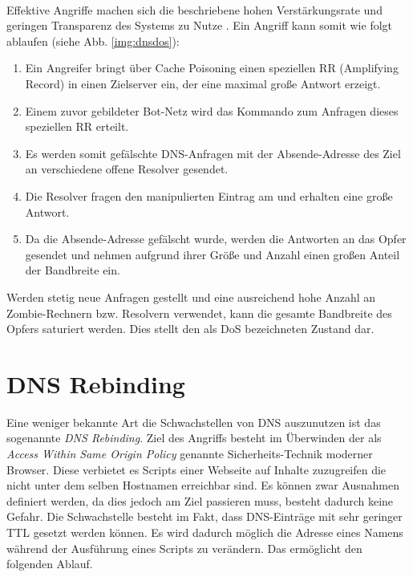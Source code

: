 \paragraph{}
Effektive Angriffe machen sich die beschriebene hohen Verstärkungsrate und geringen Transparenz des Systems zu Nutze \cite{Kambourakis2008}. Ein Angriff kann somit wie folgt ablaufen (siehe Abb. \ref{img:dnsdos}):
\begin{enumerate}[topsep=0pt,itemsep=-1ex,partopsep=1ex,parsep=1ex]
    \item Ein Angreifer bringt über Cache Poisoning einen speziellen RR (Amplifying Record) in einen Zielserver ein, der eine maximal große Antwort erzeigt.
    \item Einem zuvor gebildeter Bot-Netz wird das Kommando zum Anfragen dieses speziellen RR erteilt. 
    \item Es werden somit gefälschte DNS-Anfragen mit der Absende-Adresse des Ziel an verschiedene offene Resolver gesendet.
    \item Die Resolver fragen den manipulierten Eintrag am und erhalten eine große Antwort.
    \item Da die Absende-Adresse gefälscht wurde, werden die Antworten an das Opfer gesendet und nehmen aufgrund ihrer Größe und Anzahl einen großen Anteil der Bandbreite ein. 
\end{enumerate}
Werden stetig neue Anfragen gestellt und eine ausreichend hohe Anzahl an Zombie-Rechnern bzw. Resolvern verwendet, kann die gesamte Bandbreite des Opfers saturiert werden. Dies stellt den als \ac{DoS} bezeichneten Zustand dar.

\section{DNS Rebinding}
\label{sec:attack-dnsrebind}
Eine weniger bekannte Art die Schwachstellen von DNS auszunutzen ist das sogenannte \textit{DNS Rebinding}. Ziel des Angriffs besteht im Überwinden der als \textit{Access Within Same Origin Policy} genannte Sicherheits-Technik moderner Browser. Diese verbietet es Scripts einer Webseite auf Inhalte zuzugreifen die nicht unter dem selben Hostnamen erreichbar sind. Es können zwar Ausnahmen definiert werden, da dies jedoch am Ziel passieren muss, besteht dadurch keine Gefahr. Die Schwachstelle besteht im Fakt, dass DNS-Einträge mit sehr geringer TTL gesetzt werden können. Es wird dadurch möglich die Adresse eines Namens während der Ausführung eines Scripts zu verändern\cite{Jackson2009}. Das ermöglicht den folgenden Ablauf.

